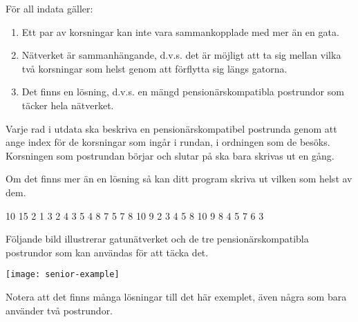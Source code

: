 \documentclass{boi2014-se}
\begin{document}
    För all indata gäller:
    \begin{enumerate}
        \item Ett par av korsningar kan inte vara sammankopplade med mer än en gata.
        \item Nätverket är sammanhängande, d.v.s. det är möjligt att ta sig mellan vilka två korsningar som helst genom att förflytta sig längs gatorna.
        \item Det finns en lösning, d.v.s. en mängd pensionärskompatibla postrundor som täcker hela nätverket.
    \end{enumerate}

    \Output
    Varje rad i utdata ska beskriva en pensionärskompatibel postrunda genom
    att ange index för de korsningar som ingår i rundan, i ordningen som de
    besöks. Korsningen som postrundan börjar och slutar på ska bara skrivas ut
    en gång.

    Om det finns mer än en lösning så kan ditt program skriva ut vilken
    som helst av dem.

    \Example

    \example
    {
        10 15  2  1 3  2 4  3 5  4 8  7  5 7  8  10  9
    }
    {
        2 3 4 5 8 10 9  8 4  5 7 6 3
    }
    {
        Följande bild illustrerar gatunätverket och de tre pensionärskompatibla
        postrundor som kan användas för att täcka det.

        \texttt{[image: senior-example]}

        Notera att det finns många lösningar till det här exemplet, även några
        som bara använder två postrundor.
    
    }
\end{document}
